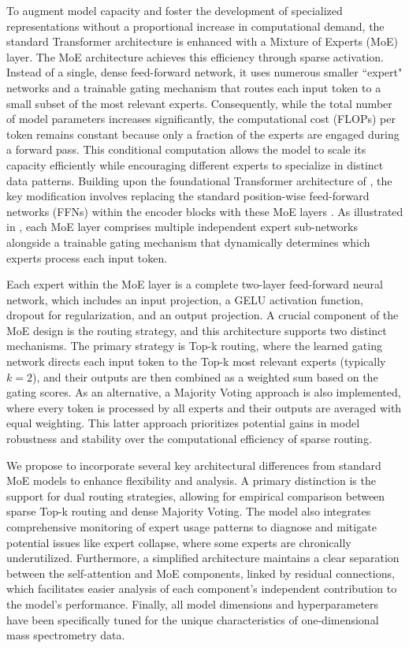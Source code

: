 To augment model capacity and foster the development of specialized representations without a proportional increase in computational demand, the standard Transformer architecture is enhanced with a Mixture of Experts (MoE) layer. The MoE architecture achieves this efficiency through sparse activation. Instead of a single, dense feed-forward network, it uses numerous smaller ``expert" networks and a trainable gating mechanism that routes each input token to a small subset of the most relevant experts. Consequently, while the total number of model parameters increases significantly, the computational cost (FLOPs) per token remains constant because only a fraction of the experts are engaged during a forward pass. This conditional computation allows the model to scale its capacity efficiently while encouraging different experts to specialize in distinct data patterns. Building upon the foundational Transformer architecture of \cite{Vaswani2017}, the key modification involves replacing the standard position-wise feed-forward networks (FFNs) within the encoder blocks with these MoE layers \citep{Jacobs1991, Kaiser2017}. As illustrated in , each MoE layer comprises multiple independent expert sub-networks alongside a trainable gating mechanism that dynamically determines which experts process each input token.

Each expert within the MoE layer is a complete two-layer feed-forward neural network, which includes an input projection, a GELU activation function, dropout for regularization, and an output projection. A crucial component of the MoE design is the routing strategy, and this architecture supports two distinct mechanisms. The primary strategy is Top-k routing, where the learned gating network directs each input token to the Top-k most relevant experts (typically $k=2$), and their outputs are then combined as a weighted sum based on the gating scores. As an alternative, a Majority Voting approach is also implemented, where every token is processed by all experts and their outputs are averaged with equal weighting. This latter approach prioritizes potential gains in model robustness and stability over the computational efficiency of sparse routing.

We propose to incorporate several key architectural differences from standard MoE models to enhance flexibility and analysis. A primary distinction is the support for dual routing strategies, allowing for empirical comparison between sparse Top-k routing and dense Majority Voting. The model also integrates comprehensive monitoring of expert usage patterns to diagnose and mitigate potential issues like expert collapse, where some experts are chronically underutilized. Furthermore, a simplified architecture maintains a clear separation between the self-attention and MoE components, linked by residual connections, which facilitates easier analysis of each component's independent contribution to the model's performance. Finally, all model dimensions and hyperparameters have been specifically tuned for the unique characteristics of one-dimensional mass spectrometry data.

